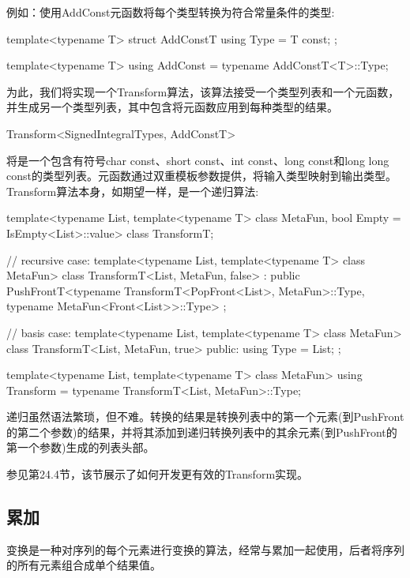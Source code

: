 例如：使用AddConst元函数将每个类型转换为符合常量条件的类型:

\begin{cpp}
template<typename T>
struct AddConstT
{
	using Type = T const;
};

template<typename T>
using AddConst = typename AddConstT<T>::Type;
\end{cpp}

为此，我们将实现一个Transform算法，该算法接受一个类型列表和一个元函数，并生成另一个类型列表，其中包含将元函数应用到每种类型的结果。

\begin{cpp}
Transform<SignedIntegralTypes, AddConstT>
\end{cpp}

将是一个包含有符号char const、short const、int const、long const和long long const的类型列表。元函数通过双重模板参数提供，将输入类型映射到输出类型。Transform算法本身，如期望一样，是一个递归算法:

\begin{cpp}
template<typename List, template<typename T> class MetaFun,
bool Empty = IsEmpty<List>::value>
class TransformT;

// recursive case:
template<typename List, template<typename T> class MetaFun>
class TransformT<List, MetaFun, false>
: public PushFrontT<typename TransformT<PopFront<List>, MetaFun>::Type,
typename MetaFun<Front<List>>::Type>
{
};

// basis case:
template<typename List, template<typename T> class MetaFun>
class TransformT<List, MetaFun, true>
{
	public:
	using Type = List;
};

template<typename List, template<typename T> class MetaFun>
using Transform = typename TransformT<List, MetaFun>::Type;
\end{cpp}

递归虽然语法繁琐，但不难。转换的结果是转换列表中的第一个元素(到PushFront的第二个参数)的结果，并将其添加到递归转换列表中的其余元素(到PushFront的第一个参数)生成的列表头部。

参见第24.4节，该节展示了如何开发更有效的Transform实现。

\subsection{累加}

变换是一种对序列的每个元素进行变换的算法，经常与累加一起使用，后者将序列的所有元素组合成单个结果值。

